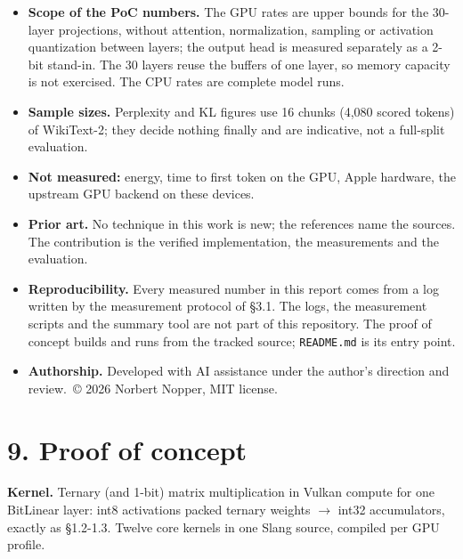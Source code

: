 \documentclass[
  10pt,
]{article}
\providecommand{\tightlist}{%
  \setlength{\itemsep}{0pt}\setlength{\parskip}{0pt}}
\begin{document}
\begin{itemize}
\tightlist%
\item
  \textbf{Scope of the PoC numbers.} The GPU rates are upper bounds for
  the 30-layer projections, without attention, normalization, sampling or
  activation quantization between layers; the output head is measured
  separately as a 2-bit stand-in. The 30 layers reuse the buffers of one
  layer, so memory capacity is not exercised. The CPU rates are complete
  model runs.
\item
  \textbf{Sample sizes.} Perplexity and KL figures use 16 chunks (4,080
  scored tokens) of WikiText-2; they decide nothing finally and are
  indicative, not a full-split evaluation.
\item
  \textbf{Not measured:} energy, time to first token on the GPU, Apple
  hardware, the upstream GPU backend on these devices.
\item
  \textbf{Prior art.} No technique in this work is new; the references
  name the sources. The contribution is the verified implementation, the
  measurements and the evaluation.
\item
  \textbf{Reproducibility.} Every measured number in this report comes
  from a log written by the measurement protocol of \S{}3.1. The logs,
  the measurement scripts and the summary tool are not part of this
  repository. The proof of concept builds and runs from the tracked
  source; \texttt{README.md} is its entry point.
\item
  \textbf{Authorship.} Developed with AI assistance under the author's
  direction and review.\ \copyright{} 2026 Norbert Nopper, MIT license.
\end{itemize}

\section{9. Proof of concept}\label{proof-of-concept}

\textbf{Kernel.} Ternary (and 1-bit) matrix multiplication in Vulkan
compute for one BitLinear layer: int8 activations \texttimes{} packed ternary
weights $\rightarrow$ int32 accumulators, exactly as \S{}1.2-1.3. Twelve
core kernels in one Slang source, compiled per GPU profile.
\end{document}

